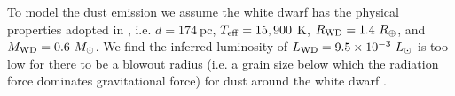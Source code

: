 \documentclass[useAMS,usenatbib]{mn2e}
\begin{document}

To model the dust emission we assume the white dwarf has the physical properties adopted in \cite{2015Natur.526..546V}, i.e. $d = 174~$pc, $T_{\rm eff} = 15,900~$K, $R_{\rm WD} = 1.4~R_{\oplus}$, and $M_{\rm WD} = 0.6~M_{\odot}$. We find the inferred luminosity of $L_{\rm WD} = 9.5\times10^{-3}~L_{\odot}$ is too low for there to be a blowout radius (i.e. a grain size below which the radiation force dominates gravitational force) for dust around the white dwarf \citep{1979Icar...40....1B}. 
\end{document}
